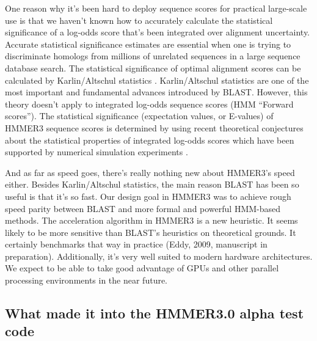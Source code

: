 One reason why it's been hard to deploy sequence scores for practical
large-scale use is that we haven't known how to accurately calculate
the statistical significance of a log-odds score that's been
integrated over alignment uncertainty. Accurate statistical
significance estimates are essential when one is trying to
discriminate homologs from millions of unrelated sequences in a large
sequence database search. The statistical significance of optimal
alignment scores can be calculated by Karlin/Altschul statistics
\citep{Karlin90,KarlinAltschul93}. Karlin/Altschul statistics are one
of the most important and fundamental advances introduced by BLAST.
However, this theory doesn't apply to integrated log-odds sequence
scores (HMM ``Forward scores'').  The statistical significance
(expectation values, or E-values) of HMMER3 sequence scores is
determined by using recent theoretical conjectures about the
statistical properties of integrated log-odds scores which have been
supported by numerical simulation experiments \citep{Eddy08}.

And as far as speed goes, there's really nothing new about HMMER3's
speed either. Besides Karlin/Altschul statistics, the main reason
BLAST has been so useful is that it's so fast.  Our design goal in
HMMER3 was to achieve rough speed parity between BLAST and more formal
and powerful HMM-based methods.  The acceleration algorithm in HMMER3
is a new heuristic. It seems likely to be more sensitive than BLAST's
heuristics on theoretical grounds. It certainly benchmarks that way in
practice (Eddy, 2009, manuscript in preparation). Additionally, it's
very well suited to modern hardware architectures. We expect to be
able to take good advantage of GPUs and other parallel processing
environments in the near future.



\subsection{What made it into the HMMER3.0 alpha test code}

